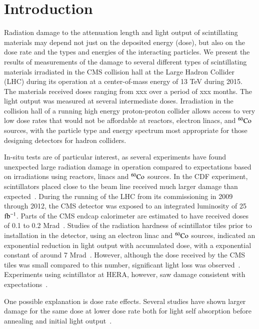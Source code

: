 \documentclass[review]{elsarticle}
\begin{document}
\linenumbers

\section{Introduction}
\label{sec:Introduction}
Radiation damage to the attenuation length and light output
of scintillating materials may depend not just on the deposited energy (dose),
but also on the dose rate and the types and energies of the interacting particles.
We present the
results of measurements of the damage to several different types
of scintillating materials irradiated in the CMS collision hall at the Large Hadron Collider (LHC) during its operation at a center-of-mass energy
of 13 TeV during 2015.
The materials received doses ranging from {\color{red} xxx} over a period
of {\color{red} xxx} months.  The light output was measured at several intermediate doses.
Irradiation in the collision hall of a running high energy
proton-proton collider allows access to very low dose rates that
would not be affordable at reactors, electron linacs,
and ${\rm ^{60}Co}$ sources, with the particle type and energy
spectrum most appropriate for those designing detectors for hadron colliders.


In-situ tests are of particular interest, as several experiments
have found unexpected large radiation damage in operation
compared to expectations
based on irradiations using reactors, linacs and ${\rm ^{60}Co}$ sources.
In the CDF experiment, scintillators
placed close to the
beam line received much larger damage than expected~\cite{Giokaris1993315}.
During the running of the LHC from its commissioning in 2009
through 2012, the CMS
detector was exposed to an integrated luminosity of 25 ${\rm fb^{-1}}$.  Parts of the
CMS endcap calorimeter are estimated to have received doses of 0.1 to 0.2 Mrad~\cite{ecfa2015}.
Studies of the radiation hardness of scintillator tiles
prior to installation in the detector,
using an electron linac and ${\rm ^{60}Co}$ sources,
indicated an exponential reduction in 
light output with accumulated dose, with a exponential constant of 
around 7 Mrad~\cite{vasken,ByonWagner1993263}.  
However, although the dose received by the CMS tiles was
small compared to this number,
significant light loss was observed~\cite{phaseiitdr}.
Experiments using scintillator at HERA, however, saw damage
consistent with expectations~\cite{Bohnet:87278}.

One possible explanation is dose rate effects.
Several studies have shown larger damage for the same dose at lower dose
rate both for light self absorption before annealing and initial light output~\cite{sauli,34504,Wick1991472,289295,173180,173178,Giokaris1993315,Biagtan1996125}.
\end{document}
